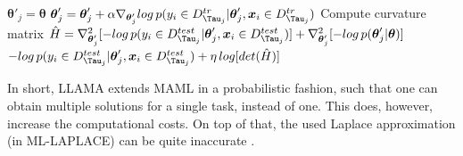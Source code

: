 \begin{algorithm}
\caption{ML-LAPLACE }\label{alg:llamaSUB}
\begin{algorithmic}[1]
\State $\boldsymbol{\theta}'_{j} = \boldsymbol{\theta}$
    \State $\boldsymbol{\theta}'_{j} = \boldsymbol{\theta}'_{j} + \alpha \nabla_{\boldsymbol{\theta}'_{j}} log \, p(y_{i} \in D^{tr}_{\Tau_{j}}|\boldsymbol{\theta}'_{j}, \boldsymbol{x}_{i} \in D^{tr}_{\Tau_{j}})$
\EndFor
\State Compute curvature matrix $\hat{H} = \nabla_{\boldsymbol{\theta}'_{j}}^{2}[-log \, p(y_{i} \in D^{test}_{\Tau_{j}}| \boldsymbol{\theta}'_{j}, \boldsymbol{x}_{i} \in D^{test}_{\Tau_{j}})] + \nabla_{\boldsymbol{\theta}'_{j}}^{2}[-log \, p(\boldsymbol{\theta}'_{j}|\boldsymbol{\theta})]$
\State \Return $-log \, p(y_{i} \in D^{test}_{\Tau_{j}}| \boldsymbol{\theta}'_{j}, \boldsymbol{x}_{i} \in D^{test}_{\Tau_{j}}) + \eta \,log[det(\hat{H})]$
\end{algorithmic}
\end{algorithm}
In short, LLAMA extends MAML in a probabilistic fashion, such that one can obtain multiple solutions for a single task, instead of one. This does, however, increase the computational costs. On top of that, the used Laplace approximation (in ML-LAPLACE) can be quite inaccurate .


